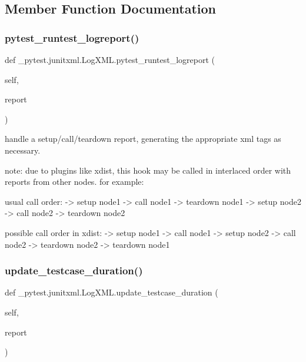 \subsection{Member Function Documentation}
\mbox{\label{class__pytest_1_1junitxml_1_1_log_x_m_l_a4f6e1a407df493153752af6b45889fc4}} 
\subsubsection{\texorpdfstring{pytest\+\_\+runtest\+\_\+logreport()}{pytest\_runtest\_logreport()}}
{\footnotesize\ttfamily def \+\_\+pytest.\+junitxml.\+Log\+X\+M\+L.\+pytest\+\_\+runtest\+\_\+logreport (\begin{DoxyParamCaption}\item[{}]{self,  }\item[{}]{report }\end{DoxyParamCaption})}

\begin{DoxyVerb}handle a setup/call/teardown report, generating the appropriate
xml tags as necessary.

note: due to plugins like xdist, this hook may be called in interlaced
order with reports from other nodes. for example:

usual call order:
    -> setup node1
    -> call node1
    -> teardown node1
    -> setup node2
    -> call node2
    -> teardown node2

possible call order in xdist:
    -> setup node1
    -> call node1
    -> setup node2
    -> call node2
    -> teardown node2
    -> teardown node1
\end{DoxyVerb}
 \mbox{\label{class__pytest_1_1junitxml_1_1_log_x_m_l_af9cabebf026496f03c7b45c3c86662fb}} 
\subsubsection{\texorpdfstring{update\+\_\+testcase\+\_\+duration()}{update\_testcase\_duration()}}
{\footnotesize\ttfamily def \+\_\+pytest.\+junitxml.\+Log\+X\+M\+L.\+update\+\_\+testcase\+\_\+duration (\begin{DoxyParamCaption}\item[{}]{self,  }\item[{}]{report }\end{DoxyParamCaption})}

